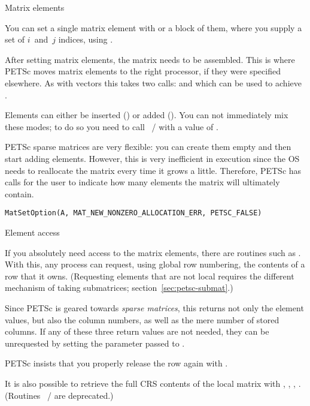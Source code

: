  {Matrix elements}
\label{sec:petsc-matset}

You can set a single matrix element with
%
%
or a block of them, where you
supply a set of $i$~and~$j$ indices, using
%
. 

After setting matrix elements, the matrix needs to be assembled. This
is where PETSc moves matrix elements to the right processor, if they
were specified elsewhere. As with vectors this takes two calls:
%
and
%
which can be used to achieve .

Elements can either be inserted
() or added
().
You can not immediately mix these modes; to do so you need to call
~/ 
with a value of .

PETSc sparse matrices are very flexible: you can create them empty and
then start adding elements. However, this is very inefficient in
execution since the \ac{OS} needs to reallocate the matrix every time
it grows a little. Therefore, PETSc has calls for the user to indicate
how many elements the matrix will ultimately contain.
%
\begin{lstlisting}
MatSetOption(A, MAT_NEW_NONZERO_ALLOCATION_ERR, PETSC_FALSE)
\end{lstlisting}

 {Element access}

If you absolutely need access to the matrix elements, there are
routines such as 
.
With this, any process can request, using global row numbering,
the contents of a row that it owns.
(Requesting elements that are not local requires the
different mechanism of taking submatrices; section~\ref{sec:petsc-submat}.)

Since PETSc is geared towards
\emph{sparse matrices},
this returns not only the element values, but also the column numbers,
as well as the mere number of stored columns.
If any of these three return values are not needed, they can be
unrequested by setting the parameter passed to .

PETSc insists that you properly release the row again with
.

It is also possible to retrieve the full \ac{CRS} contents
of the local matrix with
,
,
,
.
(Routines ~/ 
are deprecated.)

